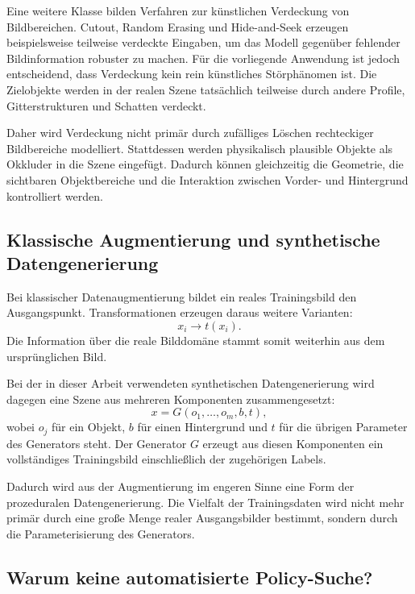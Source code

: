 Eine weitere Klasse bilden Verfahren zur künstlichen Verdeckung von Bildbereichen. Cutout, Random Erasing und Hide-and-Seek erzeugen beispielsweise teilweise verdeckte Eingaben, um das Modell gegenüber fehlender Bildinformation robuster zu machen. Für die vorliegende Anwendung ist jedoch entscheidend, dass Verdeckung kein rein künstliches Störphänomen ist. Die Zielobjekte werden in der realen Szene tatsächlich teilweise durch andere Profile, Gitterstrukturen und Schatten verdeckt.

Daher wird Verdeckung nicht primär durch zufälliges Löschen rechteckiger Bildbereiche modelliert. Stattdessen werden physikalisch plausible Objekte als Okkluder in die Szene eingefügt. Dadurch können gleichzeitig die Geometrie, die sichtbaren Objektbereiche und die Interaktion zwischen Vorder- und Hintergrund kontrolliert werden.

\subsection{Klassische Augmentierung und synthetische Datengenerierung}

Bei klassischer Datenaugmentierung bildet ein reales Trainingsbild den Ausgangspunkt. Transformationen erzeugen daraus weitere Varianten:
\begin{equation}
x_i \rightarrow t(x_i).
\end{equation}
Die Information über die reale Bilddomäne stammt somit weiterhin aus dem ursprünglichen Bild.

Bei der in dieser Arbeit verwendeten synthetischen Datengenerierung wird dagegen eine Szene aus mehreren Komponenten zusammengesetzt:
\begin{equation}
x = G(o_1,\ldots,o_m,b,t),
\tag{3.4}
\end{equation}
wobei $o_j$ für ein Objekt, $b$ für einen Hintergrund und $t$ für die übrigen Parameter des Generators steht. Der Generator $G$ erzeugt aus diesen Komponenten ein vollständiges Trainingsbild einschließlich der zugehörigen Labels.

Dadurch wird aus der Augmentierung im engeren Sinne eine Form der prozeduralen Datengenerierung. Die Vielfalt der Trainingsdaten wird nicht mehr primär durch eine große Menge realer Ausgangsbilder bestimmt, sondern durch die Parameterisierung des Generators.

\subsection{Warum keine automatisierte Policy-Suche?}

